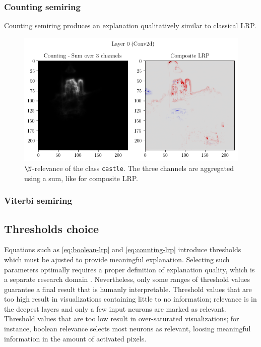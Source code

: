 \documentclass{../cs-classes/cs-classes}
\newcommand*{\1}{\digitsbb{1}}
\newcommand*{\0}{\digitsbb{0}}
\begin{document}
\subsubsection{Counting semiring}
Counting semiring produces an explanation qualitatively similar to classical LRP. 
\begin{figure}[H]
    \centering
    \includegraphics[width=.65\textwidth]{vgg-counting.png}
    \caption{$\N$-relevance of the class \texttt{castle}. The three channels are aggregated\\ using a sum, like for composite LRP.}
\end{figure}

\subsubsection{Viterbi semiring}

\subsection{Thresholds choice}
\label{seq:thresholds-choice}
Equations such as \ref{eq:boolean-lrp} and \ref{eq:counting-lrp} introduce thresholds which must be ajusted to provide meaningful explanation. Selecting such parameters optimally requires a proper definition of explanation quality, which is a separate research domain \cite{samek2016evaluating}. Nevertheless, only some ranges of threshold values guarantee a final result that is humanly interpretable. Threshold values that are too high result in visualizations containing little to no information; relevance is  in the deepest layers and only a few input neurons are marked as relevant. Threshold values that are too low result in over-saturated visualizations; for instance, boolean relevance selects most neurons as relevant, loosing meaningful information in the amount of activated pixels.
\end{document}
